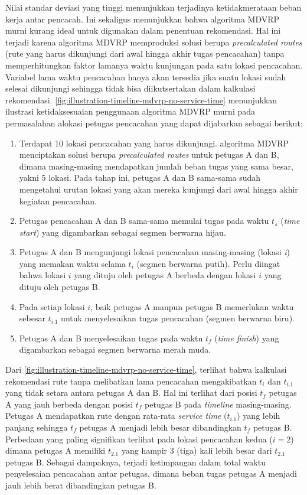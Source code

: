 Nilai standar deviasi yang tinggi menunjukkan terjadinya ketidakmerataan beban kerja antar pencacah. Ini sekaligus menunjukkan bahwa algoritma MDVRP murni kurang ideal untuk digunakan dalam penentuan rekomendasi. Hal ini terjadi karena algoritma MDVRP memproduksi solusi berupa \textit{precalculated routes} (rute yang harus dikunjungi dari awal hingga akhir tugas pencacahan) tanpa memperhitungkan faktor lamanya waktu kunjungan pada satu lokasi pencacahan. Variabel lama waktu pencacahan hanya akan tersedia jika suatu lokasi sudah selesai dikunjungi sehingga tidak bisa diikutsertakan dalam kalkulasi rekomendasi. \autoref{fig:illustration-timeline-mdvrp-no-service-time} menunjukkan ilustrasi ketidaksesuaian penggunaan algoritma MDVRP murni pada permasalahan alokasi petugas pencacahan yang dapat dijabarkan sebagai berikut:
\begin{enumerate}
	\item Terdapat 10 lokasi pencacahan yang harus dikunjungi. algoritma MDVRP menciptakan solusi berupa \textit{precalculated routes} untuk petugas A dan B, dimana masing-masing mendapatkan jumlah beban tugas yang sama besar, yakni 5 lokasi. Pada tahap ini, petugas A dan B sama-sama sudah mengetahui urutan lokasi yang akan mereka kunjungi dari awal hingga akhir kegiatan pencacahan. 
	\item Petugas pencacahan A dan B sama-sama memulai tugas pada waktu $t_{s}$ (\textit{time start}) yang digambarkan sebagai segmen berwarna hijau.
	\item Petugas A dan B mengunjungi lokasi pencacahan masing-masing (lokasi \textit{i}) yang memakan waktu selama $t_{i}$ (segmen berwarna putih). Perlu diingat bahwa lokasi $i$ yang dituju oleh petugas A berbeda dengan lokasi $i$ yang dituju oleh petugas B.
	\item Pada setiap lokasi $i$, baik petugas A maupun petugas B memerlukan waktu sebesar $t_{i.1}$ untuk menyelesaikan tugas pencacahan (segmen berwarna biru).  
	\item Petugas A dan B menyelesaikan tugas pada waktu $t_{f}$ (\textit{time finish}) yang digambarkan sebagai segmen berwarna merah muda. 
\end{enumerate}

Dari \autoref{fig:illustration-timeline-mdvrp-no-service-time}, terlihat bahwa kalkulasi rekomendasi rute tanpa melibatkan lama pencacahan mengakibatkan $t_{i}$ dan $t_{i.1}$ yang tidak setara antara petugas A dan B. Hal ini terlihat dari posisi $t_{f}$ petugas A yang jauh berbeda dengan posisi $t_{f}$ petugas B pada \textit{timeline} masing-masing. Petugas A mendapatkan rute dengan rata-rata \textit{service time} ($t_{i.1}$) yang lebih panjang sehingga $t_{f}$ petugas A menjadi lebih besar dibandingkan $t_{f}$ petugas B. Perbedaan yang paling signifikan terlihat pada lokasi pencacahan kedua ($i = 2$) dimana petugas A memiliki $t_{2.1}$ yang hampir 3 (tiga) kali lebih besar dari $t_{2.1}$ petugas B. Sebagai dampaknya, terjadi ketimpangan dalam total waktu penyelesaian pencacahan antar petugas, dimana beban tugas petugas A menjadi jauh lebih berat dibandingkan petugas B. 

